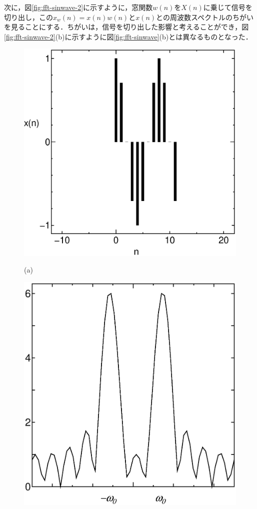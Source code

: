 次に，図\ref{fig:fft-sinwave-2}に示すように，窓関数$w(n)$を$X(n)$に乗じて信号を切り出し，この$x_w(n)=x(n)w(n)$と$x(n)$との周波数スペクトルのちがいを見ることにする．ちがいは，信号を切り出した影響と考えることができ，図\ref{fig:fft-sinwave-2}(b)に示すように図\ref{fig:fft-sinwave}(b)とは異なるものとなった．

\begin{figure}[H]
\begin{center}
\begin{minipage}{.38\textwidth}
\begin{center}
\includegraphics[width=.9\textwidth]{fig/zu-7-10-a.eps}

(a)
\end{center}
\end{minipage}
\begin{minipage}{.38\textwidth}
\begin{center}
\includegraphics[width=.9\textwidth]{fig/zu-7-10-b.eps}


\end{center}
\end{minipage}
\end{center}
\end{figure}
